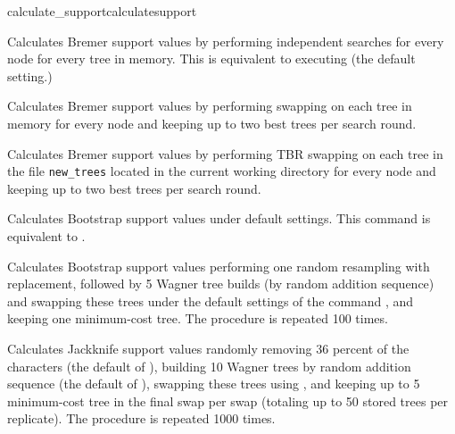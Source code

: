 \begin{command}{calculate\_support}{calculatesupport}
	\begin{poyexamples} 

            {Calculates Bremer support values by performing
            independent searches for every node for every tree in memory. 
            This is equivalent to executing  (the default setting.)}
         
            {Calculates Bremer support values by performing swapping on 
            each tree in memory for every node and keeping up to two
            best trees per search round.}
          
            {Calculates Bremer support values by performing TBR swapping on 
            each tree in the file \texttt{new\_trees} located in the current
            working directory for every node and keeping up to two
            best trees per search round.}  
            
         {Calculates Bootstrap support values under default settings. This command
         is equivalent to .}
	
            {Calculates Bootstrap support values performing one random resampling with
            replacement, followed by 5 Wagner tree builds (by random addition sequence)
            and swapping these trees under the default settings of the command 
            , and keeping one minimum-cost tree. The procedure
            is repeated 100 times.}
        
            {Calculates Jackknife support values randomly removing 36 percent of the
            characters (the default of ), building 10
            Wagner trees by random addition sequence (the default of
            ), swapping these trees using ,
            and keeping up to 5 minimum-cost tree in the
            final swap per swap (totaling up to 50 stored trees per replicate). 
            The procedure is repeated 1000 times.}

	\end{poyexamples}
            
	\begin{poyalso}
	\end{poyalso}

\end{command}

